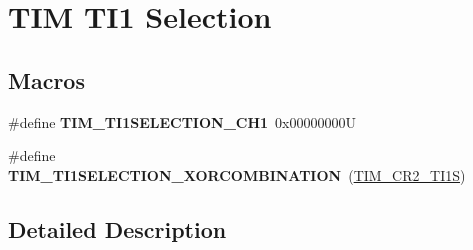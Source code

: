 \hypertarget{group___t_i_m___t_i1___selection}{}\section{T\+IM T\+I1 Selection}
\label{group___t_i_m___t_i1___selection}
\subsection*{Macros}
\begin{DoxyCompactItemize}
\item 
\mbox{\label{group___t_i_m___t_i1___selection_gace6563bccf7635461f660fbed6241488}} 
\#define {\bfseries T\+I\+M\+\_\+\+T\+I1\+S\+E\+L\+E\+C\+T\+I\+O\+N\+\_\+\+C\+H1}~0x00000000U
\item 
\mbox{\label{group___t_i_m___t_i1___selection_ga40dfcb0e3f2fdf0f45cbba227106310a}} 
\#define {\bfseries T\+I\+M\+\_\+\+T\+I1\+S\+E\+L\+E\+C\+T\+I\+O\+N\+\_\+\+X\+O\+R\+C\+O\+M\+B\+I\+N\+A\+T\+I\+ON}~(\mbox{\hyperlink{group___peripheral___registers___bits___definition_gad07504497b70af628fa1aee8fe7ef63c}{T\+I\+M\+\_\+\+C\+R2\+\_\+\+T\+I1S}})
\end{DoxyCompactItemize}


\subsection{Detailed Description}
